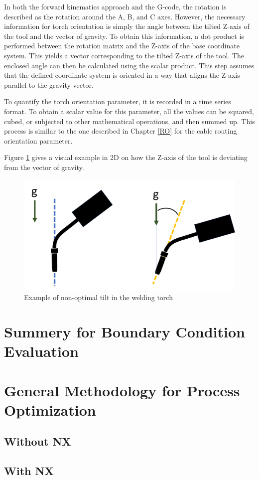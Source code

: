 In both the forward kinematics approach and the G-code, the rotation is described as the rotation around the A, B, and C axes. However, the necessary information for torch orientation is simply the angle between the tilted Z-axis of the tool and the vector of gravity. To obtain this information, a dot product is performed between the rotation matrix and the Z-axis of the base coordinate system. This yields a vector corresponding to the tilted Z-axis of the tool. The enclosed angle can then be calculated using the scalar product. This step assumes that the defined coordinate system is oriented in a way that aligns the Z-axis parallel to the gravity vector.

To quantify the torch orientation parameter, it is recorded in a time series format. To obtain a scalar value for this parameter, all the values can be squared, cubed, or subjected to other mathematical operations, and then summed up. This process is similar to the one described in Chapter \ref{RO} for the cable routing orientation parameter.

Figure \ref{tilt} gives a visual example in 2D on how the Z-axis of the tool is deviating from the vector of gravity.

\begin{figure}[H]
	\centerline{\includegraphics[width=.5\textwidth]{figures/ttilt.png}}
	\caption{Example of non-optimal tilt in the welding torch}
	\label{tilt}
\end{figure}





\section{Summery for Boundary Condition Evaluation}
\section{General Methodology for Process Optimization}
\subsection{Without NX}
\subsection{With NX}